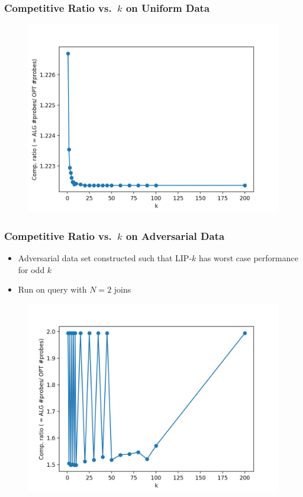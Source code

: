 \documentclass{beamer}
\begin{document}
\begin{frame}[noframenumbering]
  \frametitle{Competitive Ratio vs.\ $k$ on Uniform Data}
  \begin{figure}
    \centering
    \includegraphics[height=0.7\textheight,keepaspectratio]{cr-k-uniform}
  \end{figure}
\end{frame}




\begin{frame}[noframenumbering]

  \frametitle{Competitive Ratio vs.\ $k$ on Adversarial Data}
  \begin{itemize}
      \item Adversarial data set constructed such that LIP-$k$ has worst case performance for odd $k$
      \item Run on query with $N = 2$ joins
  \end{itemize}
  \begin{figure}
    \centering
    \includegraphics[height=0.7\textheight,keepaspectratio]{cr-k-skewed}
  \end{figure}
\end{frame}
\end{document}
